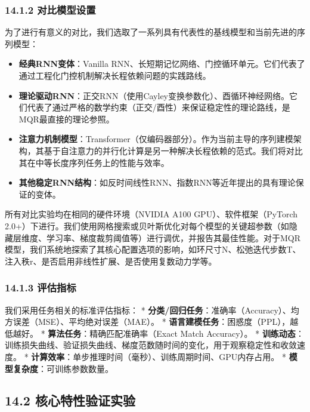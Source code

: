 \documentclass[
  12pt,
]{article}
\providecommand{\tightlist}{%
  \setlength{\itemsep}{0pt}\setlength{\parskip}{0pt}}
\begin{document}
\hypertarget{ux5bf9ux6bd4ux6a21ux578bux8bbeux7f6e}{%
\subsubsection{14.1.2
对比模型设置}\label{ux5bf9ux6bd4ux6a21ux578bux8bbeux7f6e}}

为了进行有意义的对比，我们选取了一系列具有代表性的基线模型和当前先进的序列模型：

\begin{itemize}
\tightlist
\item
  \textbf{经典RNN变体}：Vanilla
  RNN、长短期记忆网络、门控循环单元。它们代表了通过工程化门控机制解决长程依赖问题的实践路线。
\item
  \textbf{理论驱动RNN}：正交RNN（使用Cayley变换参数化）、酉循环神经网络。它们代表了通过严格的数学约束（正交/酉性）来保证稳定性的理论路线，是MQR最直接的理论参照。
\item
  \textbf{注意力机制模型}：Transformer（仅编码器部分）。作为当前主导的序列建模架构，其基于自注意力的并行化计算是另一种解决长程依赖的范式。我们将对比其在中等长度序列任务上的性能与效率。
\item
  \textbf{其他稳定RNN结构}：如反时间线性RNN、指数RNN等近年提出的具有理论保证的变体。
\end{itemize}

所有对比实验均在相同的硬件环境（NVIDIA A100 GPU）、软件框架（PyTorch
2.0+）下进行。我们使用网格搜索或贝叶斯优化对每个模型的关键超参数（如隐藏层维度、学习率、梯度裁剪阈值等）进行调优，并报告其最佳性能。对于MQR模型，我们系统地探索了其核心配置选项的影响，如环尺寸N、松弛迭代步数T、注入秩r、是否启用非线性扩展、是否使用复数动力学等。

\hypertarget{ux8bc4ux4f30ux6307ux6807}{%
\subsubsection{14.1.3 评估指标}\label{ux8bc4ux4f30ux6307ux6807}}

我们采用任务相关的标准评估指标： *
\textbf{分类/回归任务}：准确率（Accuracy）、均方误差（MSE）、平均绝对误差（MAE）。
* \textbf{语言建模任务}：困惑度（PPL），越低越好。 *
\textbf{算法任务}：精确匹配准确率（Exact Match Accuracy）。 *
\textbf{训练动态}：训练损失曲线、验证损失曲线、梯度范数随时间的变化，用于观察稳定性和收敛速度。
* \textbf{计算效率}：单步推理时间（毫秒）、训练周期时间、GPU内存占用。 *
\textbf{模型复杂度}：可训练参数数量。

\hypertarget{ux6838ux5fc3ux7279ux6027ux9a8cux8bc1ux5b9eux9a8c}{%
\subsection{14.2
核心特性验证实验}\label{ux6838ux5fc3ux7279ux6027ux9a8cux8bc1ux5b9eux9a8c}}
\end{document}
